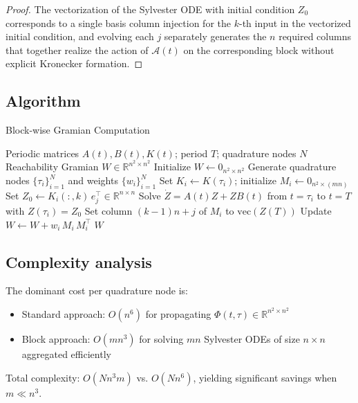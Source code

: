 \documentclass[5p,times]{elsarticle} %
\newcommand{\vect}{\mathrm{vec}}
\newcommand{\Acal}{\mathcal{A}}
\begin{document}
\begin{proof}
The vectorization of the Sylvester ODE with initial condition \(Z_0\) corresponds to a single basis column injection for the \(k\)-th input in the vectorized initial condition, and evolving each \(j\) separately generates the \(n\) required columns that together realize the action of \(\Acal(t)\) on the corresponding block without explicit Kronecker formation.
\end{proof}

\subsection{Algorithm}
\begin{algorithm}
\caption{Block-wise Gramian Computation}
\label{alg:gramian}
\begin{algorithmic}[1]
\REQUIRE Periodic matrices \(A(t), B(t), K(t)\); period \(T\); quadrature nodes \(N\)
\ENSURE Reachability Gramian \(W\in\mathbb{R}^{n^2\times n^2}\)
\STATE Initialize \(W\leftarrow 0_{n^2\times n^2}\)
\STATE Generate quadrature nodes \(\{\tau_i\}_{i=1}^N\) and weights \(\{w_i\}_{i=1}^N\)
  \STATE Set \(K_i \leftarrow K(\tau_i)\); initialize \(M_i \leftarrow 0_{n^2\times (mn)}\)
      \STATE Set \(Z_0 \leftarrow K_i(:,k)\, e_j^\top \in \mathbb{R}^{n\times n}\)
      \STATE Solve \(\dot Z = A(t)Z + ZB(t)\) from \(t=\tau_i\) to \(t=T\) with \(Z(\tau_i)=Z_0\)
      \STATE Set column \((k-1)n + j\) of \(M_i\) to \(\vect(Z(T))\)
    \ENDFOR
  \ENDFOR
  \STATE Update \(W \leftarrow W + w_i\, M_i\, M_i^\top\)
\ENDFOR
\RETURN \(W\)
\end{algorithmic}
\end{algorithm}

\subsection{Complexity analysis}
The dominant cost per quadrature node is:
\begin{itemize}
\item Standard approach: \(O(n^6)\) for propagating \(\Phi(t,\tau)\in\mathbb{R}^{n^2\times n^2}\)
\item Block approach: \(O(mn^3)\) for solving \(mn\) Sylvester ODEs of size \(n\times n\) aggregated efficiently
\end{itemize}
Total complexity: \(O(Nn^3m)\) vs. \(O(Nn^6)\), yielding significant savings when \(m\ll n^3\).
\end{document}
